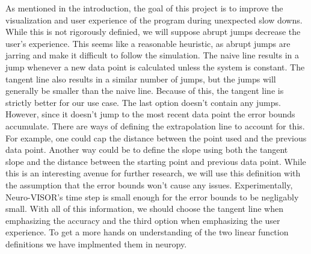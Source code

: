 As mentioned in the introduction, the goal of this project is to improve the visualization and user experience of the program during unexpected slow downs.
While this is not rigorously definied, we will suppose abrupt jumps decrease the user's experience.
This seems like a reasonable heuristic, as abrupt jumps are jarring and make it difficult to follow the simulation.
The naive line results in a jump whenever a new data point is calculated unless the system is constant.
The tangent line also results in a similar number of jumps, but the jumps will generally be smaller than the naive line.
Because of this, the tangent line is strictly better for our use case.
The last option doesn't contain any jumps.
However, since it doesn't jump to the most recent data point the error bounds accumulate.
There are ways of defining the extrapolation line to account for this.
For example, one could cap the distance between the point used and the previous data point.
Another way could be to define the slope using both the tangent slope and the distance between the starting point and previous data point.
While this is an interesting avenue for further research, we will use this definition with the assumption that the error bounds won't cause any issues.
Experimentally, Neuro-VISOR's time step is small enough for the error bounds to be negligably small\cite{neuropy}.
With all of this information,  we should choose the tangent line when emphasizing the accuracy and the third option when emphasizing the user experience.
To get a more hands on understanding of the two linear function definitions we have implmented them in neuropy.
